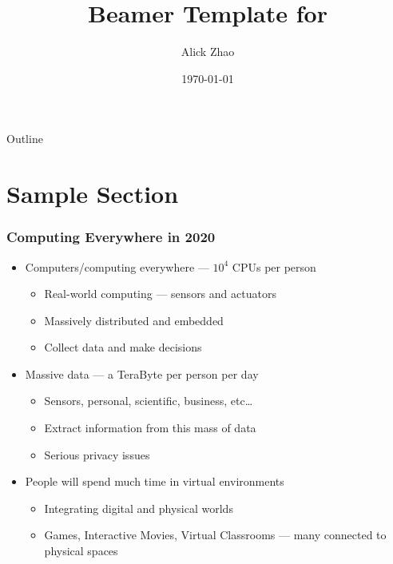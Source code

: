 \documentclass[onlycurpagenum,infolines]{beamer}
\title{Beamer Template for \tamu}
\author{Alick Zhao}
\institute[TAMU] %
{
\tamu
}
\date %
{\today}
\begin{document}
{
\begin{frame}[plain]
\titlepage
\end{frame}
}

\begin{frame}{Outline}
\tableofcontents
\end{frame}




\section{Sample Section}

\begin{frame}
  \frametitle{Computing Everywhere in 2020}
  \begin{itemize}
    \item Computers/computing everywhere --- $10^4$ CPUs per person
      \begin{itemize}
        \item Real-world computing --- sensors and actuators
        \item Massively distributed and embedded
        \item Collect data and make decisions
      \end{itemize}
    \item Massive data --- a TeraByte per person per day
      \begin{itemize}
        \item Sensors, personal, scientific, business, etc\ldots
        \item Extract information from this mass of data
        \item Serious privacy issues
      \end{itemize}
    \item People will spend much time in virtual environments
      \begin{itemize}
        \item Integrating digital and physical worlds
        \item Games, Interactive Movies, Virtual Classrooms --- many connected
        to physical spaces
      \end{itemize}
  \end{itemize}
\end{frame}
\end{document}
